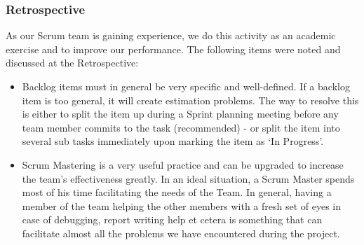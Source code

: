 \subsubsection{Retrospective}
As our Scrum team is gaining experience, we do this activity as an academic exercise and to improve our performance. The following items were noted and discussed at the Retrospective:
\begin{itemize}
\item Backlog items must in general be very specific and well-defined. If a backlog item is too general, it will create estimation problems. The way to resolve this is either to split the item up during a Sprint planning meeting before any team member commits to the task (recommended) - or split the item into several sub tasks immediately upon marking the item as `In Progress'.
\item Scrum Mastering is a very useful practice and can be upgraded to increase the team's effectiveness greatly. In an ideal situation, a Scrum Master spends most of his time facilitating the needs of the Team. In general, having a member of the team helping the other members with a fresh set of eyes in case of debugging, report writing help et cetera is something that can facilitate almost all the problems we have encountered during the project.
\end{itemize}
\newpage